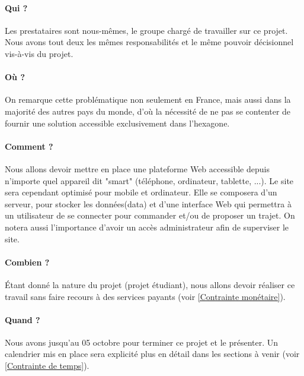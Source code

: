 \paragraph{Qui ?}
Les prestataires sont nous-mêmes, le groupe chargé de travailler sur ce projet. Nous avons tout deux les mêmes responsabilités et le même pouvoir décisionnel vis-à-vis du projet.

\paragraph{Où ?}
On remarque cette problématique non seulement en France, mais aussi dans la majorité des autres pays du monde, d'où la nécessité de ne pas se contenter de fournir une solution accessible exclusivement dans l'hexagone.

\paragraph{Comment ?}
Nous allons devoir mettre en place une plateforme Web accessible depuis n'importe quel appareil dit "smart" (téléphone, ordinateur, tablette, ...). Le site sera cependant optimisé pour mobile et ordinateur.
Elle se composera d'un serveur, pour stocker les données(data) et d'une interface Web qui permettra à un utilisateur de se connecter pour commander et/ou de proposer un trajet. On notera aussi l'importance d'avoir un accès administrateur afin de superviser le site.  

\paragraph{Combien ?}
Étant donné la nature du projet (projet étudiant), nous allons devoir réaliser ce travail sans faire recours à des services payants (voir \ref{Contrainte monétaire}).

\paragraph{Quand ?}
Nous avons jusqu'au 05 octobre pour terminer ce projet et le présenter. Un calendrier mis en place sera explicité plus en détail dans les sections à venir (voir \ref{Contrainte de temps}). 
